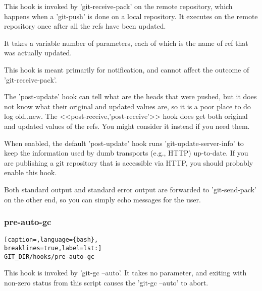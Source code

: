 This hook is invoked by 'git-receive-pack' on the remote repository, which
happens when a 'git-push' is done on a local repository. It executes on the
remote repository once after all the refs have been updated.

It takes a variable number of parameters, each of which is the name of ref that
was actually updated.

This hook is meant primarily for notification, and cannot affect the outcome of
'git-receive-pack'.

The 'post-update' hook can tell what are the heads that were pushed, but it
does not know what their original and updated values are, so it is a poor place
to do log old..new. The <<post-receive,'post-receive'>> hook does get both
original and updated values of the refs. You might consider it instead if you
need them.

When enabled, the default 'post-update' hook runs 'git-update-server-info' to
keep the information used by dumb transports (e.g., HTTP) up-to-date. If you
are publishing a git repository that is accessible via HTTP, you should
probably enable this hook.

Both standard output and standard error output are forwarded to 'git-send-pack'
on the other end, so you can simply echo messages for the user.

\subsubsection{pre-auto-gc}
\lstset{basicstyle=\scriptsize, numbers=none, captionpos=b, tabsize=4}
\begin{lstlisting}[caption=,language={bash},
breaklines=true,label=lst:]
GIT_DIR/hooks/pre-auto-gc
\end{lstlisting}

This hook is invoked by 'git-gc --auto'. It takes no parameter, and exiting
with non-zero status from this script causes the 'git-gc --auto' to abort.
